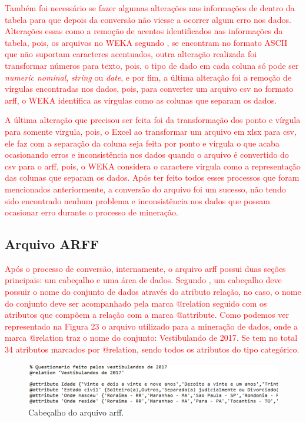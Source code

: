 \par
\textcolor{red}{Também foi necessário se fazer algumas alterações nas informações de dentro da tabela para que depois da conversão não viesse a ocorrer algum erro nos dados. Alterações essas como a remoção de acentos identificados nas informações da tabela, pois, os arquivos no WEKA segundo , se encontram no formato ASCII que não suportam caracteres acentuados, outra alteração realizada foi transformar números para texto, pois, o tipo de dado em cada coluna só pode ser \textit{numeric nominal}, \textit{string} ou \textit{date}, e por fim, a última alteração foi a remoção de vírgulas encontradas nos dados, pois, para converter um arquivo csv no formato arff, o WEKA identifica as virgulas como as colunas que separam os dados.}

\par
\textcolor{red}{A última alteração que precisou ser feita foi da transformação dos ponto e vírgula para somente virgula, pois, o Excel ao transformar um arquivo em xlsx para csv, ele faz com a separação da coluna seja feita por ponto e vírgula o que acaba ocasionando erros e inconsistência nos dados quando o arquivo é convertido do csv para o arff, pois, o WEKA considera o caractere virgula como a representação das colunas que separam os dados. Após ter feito todos esses processos que foram mencionados anteriormente, a conversão do arquivo foi um sucesso, não tendo sido encontrado nenhum problema e inconsistência nos dados que possam ocasionar erro durante o processo de mineração.}


\subsection{Arquivo ARFF}

\par
\textcolor{red}{Após o processo de conversão, internamente, o arquivo arff possui duas seções principais: um cabeçalho e uma área de dados. Segundo , um cabeçalho deve possuir o nome do conjunto de dados através do atributo relação, no caso, o nome do conjunto deve ser acompanhado pela marca @relation seguido com os atributos que compõem a relação com a marca @attribute. Como podemos ver representado na Figura 23 o arquivo utilizado para a mineração de dados, onde a marca @relation traz o nome do conjunto: Vestibulando de 2017. Se tem no total 34 atributos marcados por @relation, sendo todos os atributos do tipo categórico.} 

\par
\begin{figure}[!htp]
	\begin{center}
    \caption{\label{fig:waveform_fig} Cabeçalho do arquivo arff.}
	\includegraphics[scale=0.57]{Figuras/arquivo_arff.png}
	\end{center}
\end{figure}

